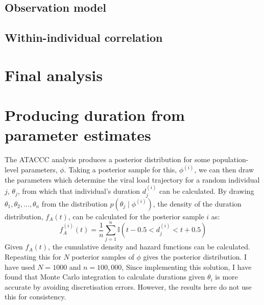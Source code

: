 \documentclass[thesis.tex]{subfiles}
\begin{document}
\subsection{Observation model}

\subsection{Within-individual correlation}

\section{Final analysis}

\section{Producing duration from parameter estimates}

The ATACCC analysis produces a posterior distribution for some population-level parameters, $\phi$.
Taking a posterior sample for this, $\phi^{(i)}$, we can then draw the parameters which determine the viral
load trajectory for a random individual $j$, $\theta_j$, from which that individual's duration $d_j^{(i)}$ can be calculated.
By drawing $\theta_1, \theta_2, \dots, \theta_n$ from the distribution $p(\theta_j \mid\phi^{(i)})$, the density of the duration distribution, $f_A(t)$, can be
calculated for the posterior sample $i$ as:
$$
f^{(i)}_A(t) = \frac{1}{n}\sum_{j=1}^n \mathbb{I} \left( t-0.5 < d_j^{(i)} < t+0.5 \right)
$$
Given $f_A(t)$, the cumulative density and hazard functions can be calculated.
Repeating this for $N$ posterior samples of $\phi$ gives the posterior distribution.
I have used $N = 1000$ and $n = 100,000$, 
Since implementing this solution, I have found that Monte Carlo integration to calculate durations given $\theta_i$ is more accurate by avoiding discretisation errors.
However, the results here do not use this for consistency.
\end{document}
